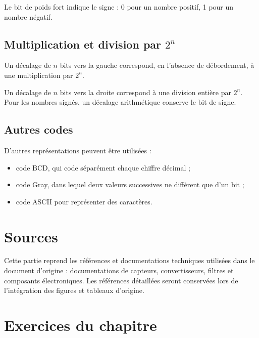Le bit de poids fort indique le signe : 0 pour un nombre positif, 1 pour un nombre négatif.

\subsection{Multiplication et division par $2^n$}

Un décalage de $n$ bits vers la gauche correspond, en l'absence de débordement, à une multiplication par $2^n$.

Un décalage de $n$ bits vers la droite correspond à une division entière par $2^n$. Pour les nombres signés, un décalage arithmétique conserve le bit de signe.

\subsection{Autres codes}

D'autres représentations peuvent être utilisées :
\begin{itemize}
  \item code BCD, qui code séparément chaque chiffre décimal ;
  \item code Gray, dans lequel deux valeurs successives ne diffèrent que d'un bit ;
  \item code ASCII pour représenter des caractères.
\end{itemize}

\section{Sources}\label{sec:elec-sources}

Cette partie reprend les références et documentations techniques utilisées dans le document d'origine : documentations de capteurs, convertisseurs, filtres et composants électroniques. Les références détaillées seront conservées lors de l'intégration des figures et tableaux d'origine.

\section{Exercices du chapitre}\label{sec:elec-exercices}


